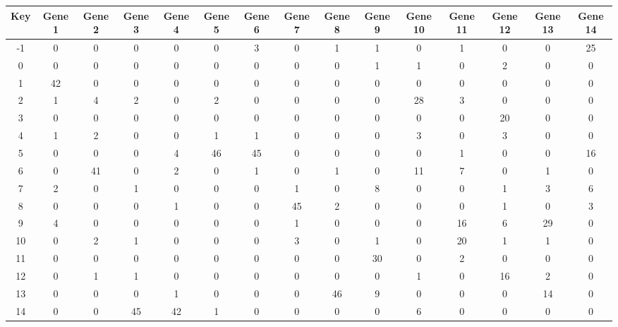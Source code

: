 \begin{tabular}{|c|c|c|c|c|c|c|c|c|c|c|c|c|c|c|}
\hline
Key & Gene 1 & Gene 2 & Gene 3 & Gene 4 & Gene 5 & Gene 6 & Gene 7 & Gene 8 & Gene 9 & Gene 10 & Gene 11 & Gene 12 & Gene 13 & Gene 14 \\
\hline
-1 & 0 & 0 & 0 & 0 & 0 & 3 & 0 & 1 & 1 & 0 & 1 & 0 & 0 & 25 \\
0 & 0 & 0 & 0 & 0 & 0 & 0 & 0 & 0 & 1 & 1 & 0 & 2 & 0 & 0 \\
1 & 42 & 0 & 0 & 0 & 0 & 0 & 0 & 0 & 0 & 0 & 0 & 0 & 0 & 0 \\
2 & 1 & 4 & 2 & 0 & 2 & 0 & 0 & 0 & 0 & 28 & 3 & 0 & 0 & 0 \\
3 & 0 & 0 & 0 & 0 & 0 & 0 & 0 & 0 & 0 & 0 & 0 & 20 & 0 & 0 \\
4 & 1 & 2 & 0 & 0 & 1 & 1 & 0 & 0 & 0 & 3 & 0 & 3 & 0 & 0 \\
5 & 0 & 0 & 0 & 4 & 46 & 45 & 0 & 0 & 0 & 0 & 1 & 0 & 0 & 16 \\
6 & 0 & 41 & 0 & 2 & 0 & 1 & 0 & 1 & 0 & 11 & 7 & 0 & 1 & 0 \\
7 & 2 & 0 & 1 & 0 & 0 & 0 & 1 & 0 & 8 & 0 & 0 & 1 & 3 & 6 \\
8 & 0 & 0 & 0 & 1 & 0 & 0 & 45 & 2 & 0 & 0 & 0 & 1 & 0 & 3 \\
9 & 4 & 0 & 0 & 0 & 0 & 0 & 1 & 0 & 0 & 0 & 16 & 6 & 29 & 0 \\
10 & 0 & 2 & 1 & 0 & 0 & 0 & 3 & 0 & 1 & 0 & 20 & 1 & 1 & 0 \\
11 & 0 & 0 & 0 & 0 & 0 & 0 & 0 & 0 & 30 & 0 & 2 & 0 & 0 & 0 \\
12 & 0 & 1 & 1 & 0 & 0 & 0 & 0 & 0 & 0 & 1 & 0 & 16 & 2 & 0 \\
13 & 0 & 0 & 0 & 1 & 0 & 0 & 0 & 46 & 9 & 0 & 0 & 0 & 14 & 0 \\
14 & 0 & 0 & 45 & 42 & 1 & 0 & 0 & 0 & 0 & 6 & 0 & 0 & 0 & 0 \\
\hline
\end{tabular}